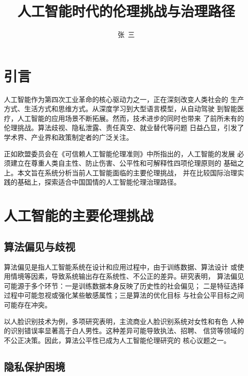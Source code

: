 \documentclass{xmu_course}
\title{人工智能时代的伦理挑战与治理路径}
\author{张\ 三}
\affiliation{厦门大学\ 人文学院，福建\ 厦门\ 361005}
\begin{document}
\makecover

\maketitle
\makefirstpagefooter


\section{引言}

人工智能作为第四次工业革命的核心驱动力之一，正在深刻改变人类社会的
生产方式、生活方式和思维方式。从深度学习到大型语言模型，从自动驾驶
到智能医疗，人工智能的应用场景不断拓展。然而，技术进步的同时也带来
了前所未有的伦理挑战。算法歧视、隐私泄露、责任真空、就业替代等问题
日益凸显，引发了学术界、产业界和政策制定者的广泛关注\cite{floridi2019}。

正如欧盟委员会在《可信赖人工智能伦理准则》中所指出的，人工智能的发展
必须建立在尊重人类自主性、防止伤害、公平性和可解释性四项伦理原则的
基础之上\cite{eu2019}。本文旨在系统分析当前人工智能面临的主要伦理挑战，
并在比较国际治理实践的基础上，探索适合中国国情的人工智能伦理治理路径。

\section{人工智能的主要伦理挑战}

\subsection{算法偏见与歧视}

算法偏见是指人工智能系统在设计和应用过程中，由于训练数据、算法设计
或使用情境等因素，导致系统输出存在系统性、不公正的差异。研究表明，
算法偏见可能源于多个环节：一是训练数据本身反映了历史性的社会偏见；
二是特征选择过程中可能忽视或强化某些敏感属性；三是算法的优化目标
与社会公平目标之间可能存在冲突\cite{mittelstadt2016}。

以人脸识别技术为例，多项研究表明，主流商业人脸识别系统对女性和有色
人种的识别错误率显著高于白人男性。这种差异可能导致执法、招聘、
信贷等领域的不公正决策。因此，算法公平性已成为人工智能伦理研究的
核心议题之一。

\subsection{隐私保护困境}
\end{document}
